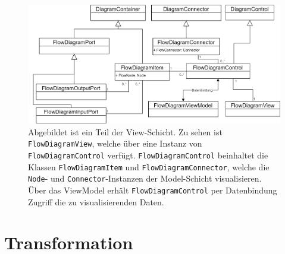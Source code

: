 \begin{figure} %
	\centering
		\includegraphics[width=\textwidth]{img/FlowViewUML.png}
	\caption[Klassenstruktur der View-Schicht]{Abgebildet ist ein Teil der View-Schicht. Zu sehen ist \texttt{FlowDiagramView}, welche über eine Instanz von \texttt{FlowDiagramControl} verfügt. \texttt{FlowDiagramControl} beinhaltet die Klassen \texttt{FlowDiagramItem} und \texttt{FlowDiagramConnector}, welche die \texttt{Node}- und \texttt{Connector}-Instanzen der Model-Schicht visualisieren. Über das ViewModel erhält \texttt{FlowDiagramControl} per Datenbindung Zugriff die zu visualisierenden Daten.}
	\label{fig:UML:FlowView}
\end{figure}


\section{Transformation}
\label{sec:Transformation}

